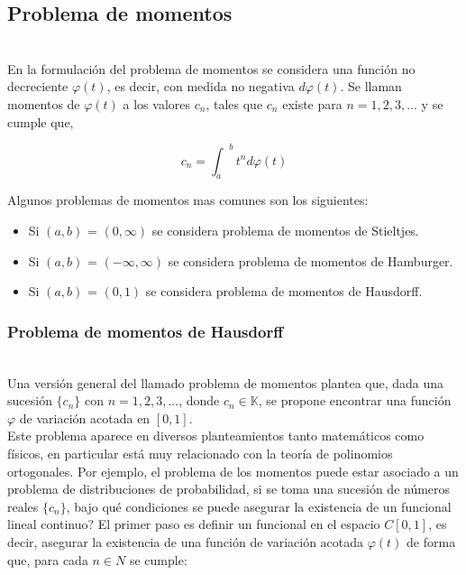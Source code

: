 \documentclass[10pt]{amsart}
\theoremstyle{remark}
\numberwithin{equation}{section}
\begin{document}
\subsection{Problema de momentos} \cite{Lib20}\\

En la formulación del problema de momentos se considera una función no decreciente $\varphi(t)$, es decir, con medida no negativa $d \varphi(t)$. Se llaman momentos de $\varphi(t)$ a los valores $c_n$, tales que $c_n$ existe para $n=1, 2, 3, ...$ y se cumple que,

\[c_n = {\int_a}^b t^n d\varphi(t) \]

Algunos problemas de momentos mas comunes son los siguientes: \begin{itemize}
\item Si $(a,b)$ = $(0,\infty)$ se considera problema de momentos de Stieltjes.

\item Si $(a,b)$ = $(-\infty,\infty)$ se considera problema de momentos de Hamburger.

\item Si $(a,b)$ = $(0,1)$ se considera problema de momentos de Hausdorff.\\

\end{itemize} 
\subsubsection{Problema de momentos de Hausdorff} \cite{ArtAca21}\\

Una versión general del llamado problema de momentos plantea que, dada una sucesión $\{c_n\}$ con $n=1, 2, 3, ...$, donde $c_n \in \mathbb{K}$, se propone encontrar una función $\varphi$ de variación acotada en $[0, 1]$.\\

Este problema aparece en diversos planteamientos tanto matemáticos como físicos, en particular está muy relacionado con la teoría de polinomios ortogonales. Por ejemplo, el problema de los momentos puede estar asociado a un problema de distribuciones de probabilidad, si se toma una sucesión de números reales $\{c_n\}$, bajo qué condiciones se puede asegurar la existencia de un funcional lineal continuo? El primer paso es definir un funcional en el espacio $C[0, 1]$, es decir, asegurar la existencia de una función de variación acotada $ \varphi(t) $ de forma que, para cada $n \in N$ se cumple:
\end{document}
